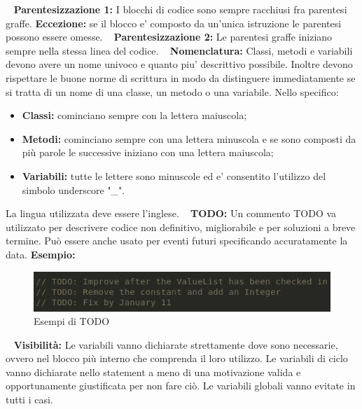 ~\newline	
	\textbf{Parentesizzazione 1:} I blocchi di codice sono sempre racchiusi fra parentesi graffe.\newline 
	\textbf{Eccezione:} se il blocco e' composto da un'unica istruzione le parentesi possono essere omesse.\newline
	~\newline
	\textbf{Parentesizzazione 2:} Le parentesi graffe iniziano sempre nella stessa linea del codice. \newline
	~\newline
	\textbf{Nomenclatura:} Classi, metodi e variabili devono avere un nome univoco e quanto piu' descrittivo possibile. Inoltre devono rispettare le buone norme di scrittura in modo da distinguere immediatamente se si tratta di un nome di una classe, un metodo o una variabile. Nello specifico:\newline
	\begin{itemize}
	\item \textbf{Classi:} cominciano sempre con la lettera maiuscola;
	\item \textbf{Metodi:} cominciano sempre con una lettera minuscola e se sono composti da più parole le successive iniziano con una lettera maiuscola;
	\item \textbf{Variabili:} tutte le lettere sono minuscole ed e' consentito l'utilizzo del simbolo underscore "\_".\newline
	\end{itemize}
	La lingua utilizzata deve essere l'inglese.\newline
	~\newline
	\textbf{TODO:} Un commento TODO va utilizzato per descrivere codice non definitivo, migliorabile e per soluzioni a breve termine. Può essere anche usato per eventi futuri specificando accuratamente la data.\newline
	\textbf{Esempio:}\newline
	\begin{figure}[!htbp]
		\centering
		\includegraphics{todo.png}
		\caption{Esempi di TODO}
	\end{figure}
	~\newline
	\textbf{Visibilità:} Le variabili vanno dichiarate strettamente dove sono necessarie, ovvero nel blocco più interno che comprenda il loro utilizzo. Le variabili di ciclo vanno dichiarate nello statement a meno di una motivazione valida e opportunamente giustificata per non fare ciò. Le variabili globali vanno evitate in tutti i casi.\newline
